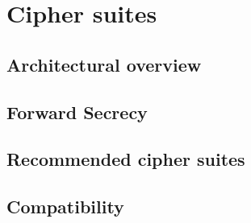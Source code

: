 
\section{Cipher suites}
\label{section:CipherSuites}


\subsection{Architectural overview }
\label{subsection:architecture}



\subsection{Forward Secrecy}
\label{subsection:PFS}



\subsection{Recommended cipher suites}
\label{section:recommendedciphers}



%


\subsection{Compatibility}
\label{subsection:compatibility}



%

